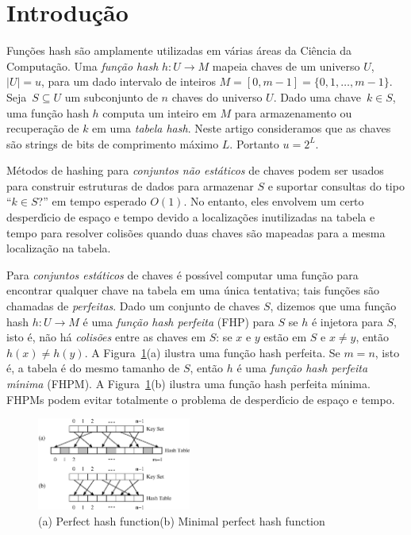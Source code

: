 \section{Introdu\c{c}\~ao}
\label{sec:introduction}
Fun\c{c}\~oes hash s\~ao amplamente utilizadas em v\'arias \'areas da
Ci\^encia da Computa\c{c}\~ao. 
Uma \textit{fun\c{c}\~ao hash} $h: U \to M$ mapeia chaves de um universo $U$, $|U|=u$, 
para um dado intervalo de inteiros $M=[0,m-1]=\{0,1,\dots,m-1\}$.
Seja~$S\subseteq U$ um subconjunto de $n$ chaves do universo $U$.
Dado uma chave~$k\in S$, uma fun\c{c}\~ao hash $h$ computa um inteiro em 
$M$ para armazenamento ou recupera\c{c}\~ao de $k$ em uma \textit{tabela hash}.
Neste artigo consideramos que as chaves s\~ao strings de bits de comprimento 
m\'aximo $L$. Portanto $u = 2^L$. 

M\'etodos de hashing para {\em conjuntos n\~ao est\'aticos} de chaves podem ser usados para
construir estruturas de dados para armazenar $S$ e suportar consultas do tipo
``$k \in S$?'' em tempo esperado $O(1)$.
No entanto, eles envolvem um certo desperd\'{\i}cio de espa\c{c}o e tempo devido
a localiza\c{c}\~oes inutilizadas na tabela e tempo para resolver colis\~oes quando duas
chaves s\~ao mapeadas para a mesma localiza\c{c}\~ao na tabela.


Para {\em conjuntos est\'aticos} de chaves \'e poss\'{\i}vel computar uma fun\c{c}\~ao
para encontrar qualquer chave na tabela em uma \'unica tentativa; tais fun\c{c}\~oes 
s\~ao chamadas de \textit{perfeitas}. 
Dado um conjunto de chaves $S$, dizemos que uma fun\c{c}\~ao hash $h:U\to M$ \'e uma
\textit{fun\c{c}\~ao hash perfeita} (FHP) para $S$ se $h$ \'e injetora para $S$,
isto \'e, n\~ao h\'a {\em colis\~oes} entre as chaves em $S$: se $x$
e $y$ est\~ao em $S$ e $x\neq y$, ent\~ao $h(x)\neq h(y)$.
A Figura~\ref{fig:minimalperfecthash-ph-mph}(a) ilustra uma fun\c{c}\~ao hash perfeita.
Se $m=n$, isto \'e, a tabela \'e do mesmo tamanho de $S$,
ent\~ao $h$ \'e uma \textit{fun\c{c}\~ao hash perfeita m\'{\i}nima} (FHPM).
A Figura~\ref{fig:minimalperfecthash-ph-mph}(b) ilustra uma 
fun\c{c}\~ao hash perfeita m\'{\i}nima.
FHPMs podem evitar totalmente o problema de desperd\'{\i}cio de espa\c{c}o e tempo.

\begin{figure}
\centering
  \includegraphics[width=0.45\textwidth, height=0.3\textheight]{figs/minimalperfecthash-ph-mph.ps}
\caption{(a) Perfect hash function\quad  (b) Minimal perfect hash function}
\label{fig:minimalperfecthash-ph-mph}
\end{figure}

